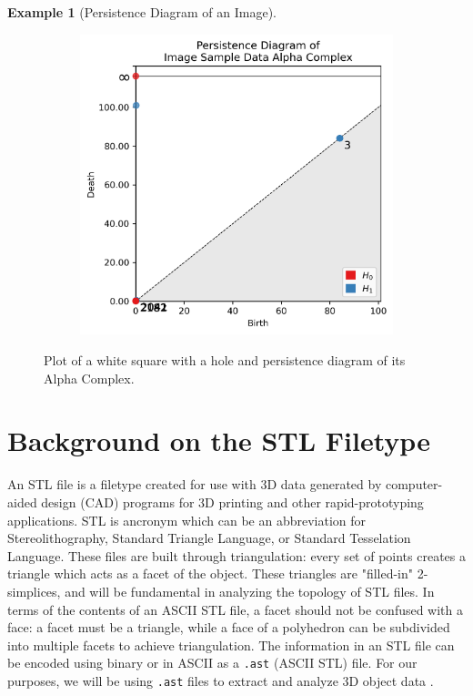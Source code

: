 \documentclass[ma]{uncgdissertationexp}
\theoremstyle{plain}
\theoremstyle{definition}
\newtheorem{example}[theorem]{Example}
\theoremstyle{remark}
\begin{document}
\begin{example}[Persistence Diagram of an Image]
\begin{figure}[H]
\begin{subfigure}[b]{0.45\textwidth}
    \end{subfigure}
    \begin{subfigure}[b]{0.5\textwidth}
        \centering
        \includegraphics[width=\textwidth]{image_data_persdia.png}
    \end{subfigure}
    \caption{Plot of a white square with a hole and persistence diagram of its Alpha Complex.}
    \label{fig:image_data_persdia}
\end{figure}
\end{example}
\newpage
\section{Background on the STL Filetype}
\par An STL file is a filetype created for use with 3D data generated by computer-aided design (CAD) programs for 3D printing and other rapid-prototyping applications. STL is ancronym which can be an abbreviation for Stereolithography, Standard Triangle Language, or Standard Tesselation Language. These files are built through triangulation: every set of points creates a triangle which acts as a facet of the object. These triangles are "filled-in" 2-simplices, and will be fundamental in analyzing the topology of STL files. In terms of the contents of an ASCII STL file, a facet should not be confused with a face: a facet must be a triangle, while a face of a polyhedron can be subdivided into multiple facets to achieve triangulation. The information in an STL file can be encoded using binary or in ASCII as a \verb".ast" (ASCII STL) file. For our purposes, we will be using \verb".ast" files to extract and analyze 3D object data \cite{analysis_of_stl}.
\end{document}
